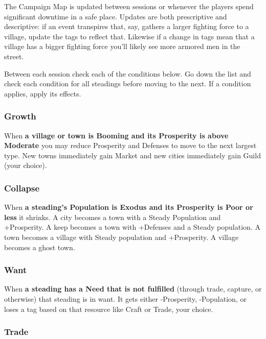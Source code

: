 The Campaign Map is updated between sessions or whenever the players spend significant downtime in a safe place. Updates are both prescriptive and descriptive: if an event transpires that, say, gathers a larger fighting force to a village, update the tags to reflect that. Likewise if a change in tags mean that a village has a bigger fighting force you'll likely see more armored men in the street.

 

Between each session check each of the conditions below. Go down the list and check each condition for all steadings before moving to the next. If a condition applies, apply its effects.

 
\subsubsection{Growth}   
 

When {\bf a village or town is Booming and its Prosperity is above Moderate}  you may reduce Prosperity and Defenses to move to the next largest type. New towns immediately gain Market and new cities immediately gain Guild (your choice).

 
\subsubsection{Collapse}   
 

When {\bf a steading's Population is Exodus and its Prosperity is Poor or less}  it shrinks. A city becomes a town with a Steady Population and +Prosperity. A keep becomes a town with +Defenses and a Steady population. A town becomes a village with Steady population and +Prosperity. A village becomes a ghost town.

 
\subsubsection{Want}  
 

When {\bf a steading has a Need that is not fulfilled}  (through trade, capture, or otherwise) that steading is in want. It gets either -Prosperity, -Population, or loses a tag based on that resource like Craft or Trade, your choice.

 
\subsubsection{Trade}   
 

